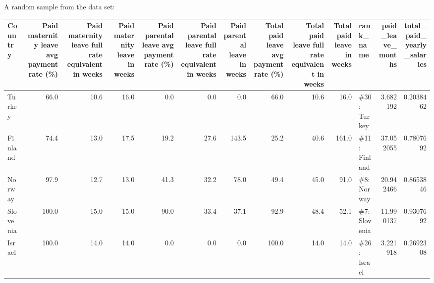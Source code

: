\documentclass[]{book}
\theoremstyle{definition}
\theoremstyle{definition}
\theoremstyle{definition}
\theoremstyle{remark}
\begin{document}
A random sample from the data set:

\begin{tabular}{l|r|r|r|r|r|r|r|r|r|l|r|r}
\hline
Country & Paid maternity leave avg payment rate (\%) & Paid maternity leave full rate equivalent in weeks & Paid maternity leave in weeks & Paid parental leave avg payment rate (\%) & Paid parental leave full rate equivalent in weeks & Paid parental leave in weeks & Total paid leave avg payment rate (\%) & Total paid leave full rate equivalent in weeks & Total paid leave in weeks & rank\_name & paid\_leave\_months & total\_paid\_yearly\_salaries\\
\hline
Turkey & 66.0 & 10.6 & 16.0 & 0.0 & 0.0 & 0.0 & 66.0 & 10.6 & 16.0 & \#30: Turkey & 3.682192 & 0.2038462\\
\hline
Finland & 74.4 & 13.0 & 17.5 & 19.2 & 27.6 & 143.5 & 25.2 & 40.6 & 161.0 & \#11: Finland & 37.052055 & 0.7807692\\
\hline
Norway & 97.9 & 12.7 & 13.0 & 41.3 & 32.2 & 78.0 & 49.4 & 45.0 & 91.0 & \#8: Norway & 20.942466 & 0.8653846\\
\hline
Slovenia & 100.0 & 15.0 & 15.0 & 90.0 & 33.4 & 37.1 & 92.9 & 48.4 & 52.1 & \#7: Slovenia & 11.990137 & 0.9307692\\
\hline
Israel & 100.0 & 14.0 & 14.0 & 0.0 & 0.0 & 0.0 & 100.0 & 14.0 & 14.0 & \#26: Israel & 3.221918 & 0.2692308\\
\hline
\end{tabular}
\end{document}
